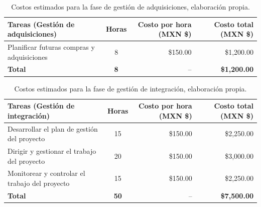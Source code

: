 \begin{table}[H]
	\centering
	\renewcommand{\arraystretch}{1.6}
	\setlength{\tabcolsep}{10pt}
	\Huge
	\begin{adjustbox}{max width=\textwidth}
		\begin{tabular}{|p{9.5cm}|c|r|r|}
			\hline
			\textbf{Tareas (Gestión de adquisiciones)} & \textbf{Horas} & \textbf{Costo por hora (MXN \$)} & \textbf{Costo total (MXN \$)} \\ \hline
			Planificar futuras compras y adquisiciones & 8 & \$150.00 & \$1,200.00 \\ \hline
			\textbf{Total} & \textbf{8} & -- & \textbf{\$1,200.00} \\ \hline
		\end{tabular}
	\end{adjustbox}
	\caption[Costos estimados para la fase de gestión de adquisiciones]{Costos estimados para la fase de gestión de adquisiciones, elaboración propia.} 	
	\label{tab:costos_adquisiciones_nuevo}
\end{table}

\begin{table}[H]
	\centering
	\renewcommand{\arraystretch}{1.6}
	\setlength{\tabcolsep}{10pt}
	\Huge
	\begin{adjustbox}{max width=\textwidth}
		\begin{tabular}{|p{9.5cm}|c|r|r|}
			\hline
			\textbf{Tareas (Gestión de integración)} & \textbf{Horas} & \textbf{Costo por hora (MXN \$)} & \textbf{Costo total (MXN \$)} \\ \hline
			Desarrollar el plan de gestión del proyecto & 15 & \$150.00 & \$2,250.00 \\ \hline
			Dirigir y gestionar el trabajo del proyecto & 20 & \$150.00 & \$3,000.00 \\ \hline
			Monitorear y controlar el trabajo del proyecto & 15 & \$150.00 & \$2,250.00 \\ \hline
			\textbf{Total} & \textbf{50} & -- & \textbf{\$7,500.00} \\ \hline
		\end{tabular}
	\end{adjustbox}
	\caption[Costos estimados para la fase de gestión de integración]{Costos estimados para la fase de gestión de integración, elaboración propia.} 	
	\label{tab:costos_integracion_nuevo}
\end{table}

